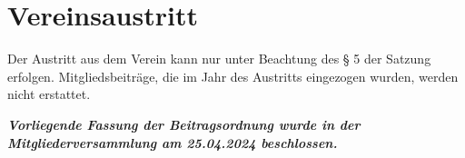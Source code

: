 \documentclass[12pt]{article}
\begin{document}
\section{Vereinsaustritt}
Der Austritt aus dem Verein kann nur unter Beachtung des § 5 der Satzung erfolgen. Mitgliedsbeiträge, die im Jahr des Austritts eingezogen wurden, werden nicht erstattet.

\begin{center}
	\textbf{\textit{Vorliegende Fassung der Beitragsordnung wurde in der Mitgliederversammlung am 25.04.2024 beschlossen.}}
\end{center}
\end{document}
